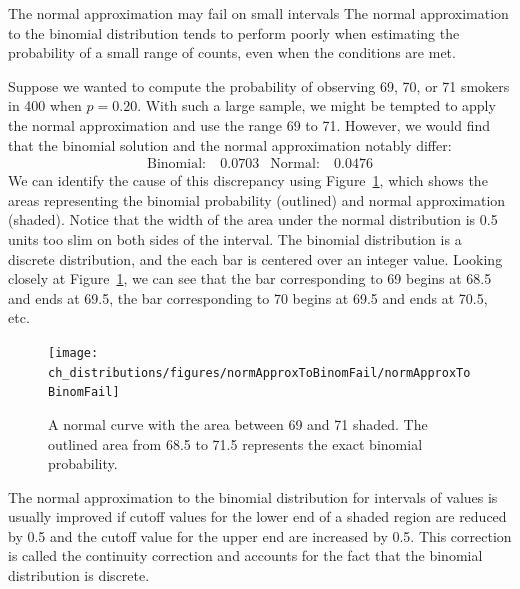 \begin{caution}
{The normal approximation may fail on small intervals}
{The normal approximation to the binomial distribution tends to perform poorly when estimating the probability of a small range of counts, even when the conditions are met.}
\end{caution}

Suppose we wanted to compute the probability of observing 69, 70, or 71 smokers in 400 when $p=0.20$. With such a large sample, we might be tempted to apply the normal approximation and use the range 69 to 71. However, we would find that the binomial solution and the normal approximation notably differ:
\begin{align*}
\text{Binomial:}&\ 0.0703
&\text{Normal:}&\ 0.0476
\end{align*}
We can identify the cause of this discrepancy using Figure~\ref{normApproxToBinomFail}, which shows the areas representing the binomial probability (outlined) and normal approximation (shaded). Notice that the width of the area under the normal distribution is 0.5 units too slim on both sides of the interval. The binomial distribution is a discrete distribution, and the each bar is centered over an integer value. Looking closely at Figure~\ref{normApproxToBinomFail}, we can see that the bar corresponding to 69 begins at 68.5 and ends at 69.5, the bar corresponding to 70 begins at 69.5 and ends at 70.5, etc.

\begin{figure}[h]
\centering
\texttt{[image: ch\_distributions/figures/normApproxToBinomFail/normApproxToBinomFail]}
\caption{A normal curve with the area between 69 and 71 shaded. The outlined area from 68.5 to 71.5 represents the exact binomial probability.}
\label{normApproxToBinomFail}
\end{figure}

\begin{tipBox}{
The normal approximation to the binomial distribution for intervals of values is usually improved if cutoff values for the lower end of a shaded region are reduced by 0.5 and the cutoff value for the upper end are increased by 0.5. This correction is called the continuity correction and accounts for the fact that the binomial distribution is discrete.}
\end{tipBox}

